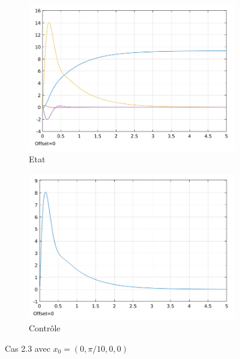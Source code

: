 \documentclass[a4paper]{article}
\begin{document}
                        \begin{figure}[h!]
                                \centering
                                \begin{subfigure}[b]{0.45\textwidth}
                                        \includegraphics[width=\textwidth]{images/courbe_cas_3_3_TP03.png}
                                        \caption{Etat}
                                        \label{fig3.13.1}
                                \end{subfigure}
                                \hspace{30pt}
                                \begin{subfigure}[b]{0.45\textwidth}
                                        \includegraphics[width=\textwidth]{images/controle_cas_3_3_TP03.png}
                                        \caption{Contrôle}
                                        \label{fig3.13.2}
                                \end{subfigure}
                                \caption{Cas 2.3 avec $x_0=(0,\pi/10,0,0)$}
                                \label{fig3.13}
                        \end{figure}
                        
\end{document}
